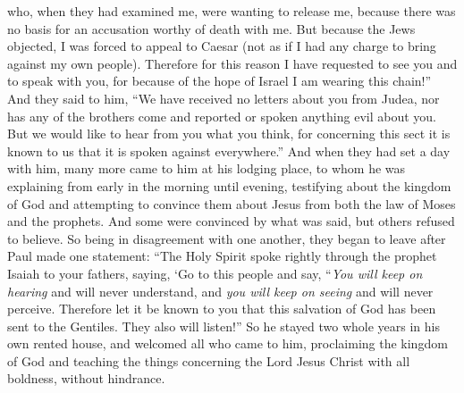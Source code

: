 \begin{biblechapter}
\verse who, when they had examined me, were wanting to release me, because there was no basis for an accusation worthy of death with me.
\verse But because the Jews objected, I was forced to appeal to Caesar (not as if I had any charge to bring against my own people).
\verse Therefore for this reason I have requested to see you and to speak with you, for because of the hope of Israel I am wearing this chain!”
\verse And they said to him, “We have received no letters about you from Judea, nor has any of the brothers come and reported or spoken anything evil about you.
\verse But we would like to hear from you what you think, for concerning this sect it is known to us that it is spoken against everywhere.”
\verse And when they had set a day with him, many more came to him at his lodging place, to whom he was explaining from early in the morning until evening, testifying about the kingdom of God and attempting to convince them about Jesus from both the law of Moses and the prophets.
\verse And some were convinced by what was said, but others refused to believe.
\verse So being in disagreement with one another, they began to leave after Paul made one statement: “The Holy Spirit spoke rightly through the prophet Isaiah to your fathers,
\verse saying,
\verse ‘Go to this people and say, 
“\textit{You will keep on hearing} and will never understand, 
and \textit{you will keep on seeing} and will never perceive.
\verse Therefore let it be known to you that this salvation of God has been sent to the Gentiles. They also will listen!”
\verse So he stayed two whole years in his own rented house, and welcomed all who came to him,
\verse proclaiming the kingdom of God and teaching the things concerning the Lord Jesus Christ with all boldness, without hindrance.
\end{biblechapter}

